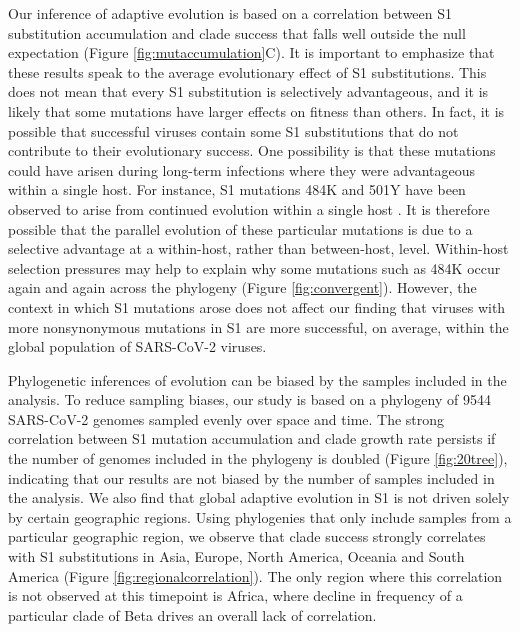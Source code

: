 \documentclass[11pt,oneside,letterpaper]{article}
\begin{document}
Our inference of adaptive evolution is based on a correlation between S1 substitution accumulation and clade success that falls well outside the null expectation (Figure \ref{fig:mutaccumulation}C).
It is important to emphasize that these results speak to the average evolutionary effect of S1 substitutions.
This does not mean that every S1 substitution is selectively advantageous, and it is likely that some mutations have larger effects on fitness than others.
In fact, it is possible that successful viruses contain some S1 substitutions that do not contribute to their evolutionary success.
One possibility is that these mutations could have arisen during long-term infections where they were advantageous within a single host.
For instance, S1 mutations 484K and 501Y have been observed to arise from continued evolution within a single host \cite{Choi2020-to}.
It is therefore possible that the parallel evolution of these particular mutations is due to a selective advantage at a within-host, rather than between-host, level.
Within-host selection pressures may help to explain why some mutations such as 484K occur again and again across the phylogeny (Figure \ref{fig:convergent}).
However, the context in which S1 mutations arose does not affect our finding that viruses with more nonsynonymous mutations in S1 are more successful, on average, within the global population of SARS-CoV-2 viruses.

Phylogenetic inferences of evolution can be biased by the samples included in the analysis.
To reduce sampling biases, our study is based on a phylogeny of 9544 SARS-CoV-2 genomes sampled evenly over space and time.
The strong correlation between S1 mutation accumulation and clade growth rate persists if the number of genomes included in the phylogeny is doubled (Figure \ref{fig:20tree}), indicating that our results are not biased by the number of samples included in the analysis.
We also find that global adaptive evolution in S1 is not driven solely by certain geographic regions.
Using phylogenies that only include samples from a particular geographic region, we observe that clade success strongly correlates with S1 substitutions in Asia, Europe, North America, Oceania and South America (Figure \ref{fig:regionalcorrelation}).
The only region where this correlation is not observed at this timepoint is Africa, where decline in frequency of a particular clade of Beta drives an overall lack of correlation.
\end{document}
